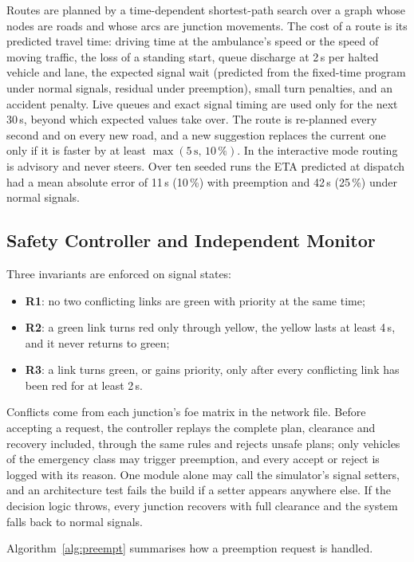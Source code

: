 \documentclass[conference]{IEEEtran}
\begin{document}
Routes are planned by a time-dependent shortest-path search over a graph whose nodes are roads and whose arcs are junction movements. The cost of a route is its predicted travel time: driving time at the ambulance's speed or the speed of moving traffic, the loss of a standing start, queue discharge at 2\,s per halted vehicle and lane, the expected signal wait (predicted from the fixed-time program under normal signals, residual under preemption), small turn penalties, and an accident penalty. Live queues and exact signal timing are used only for the next 30\,s, beyond which expected values take over. The route is re-planned every second and on every new road, and a new suggestion replaces the current one only if it is faster by at least $\max(5\,\mathrm{s},\,10\,\%)$. In the interactive mode routing is advisory and never steers. Over ten seeded runs the ETA predicted at dispatch had a mean absolute error of 11\,s (10\,\%) with preemption and 42\,s (25\,\%) under normal signals.

\subsection{Safety Controller and Independent Monitor}

Three invariants are enforced on signal states:
\begin{itemize}
\item \textbf{R1}: no two conflicting links are green with priority at the same time;
\item \textbf{R2}: a green link turns red only through yellow, the yellow lasts at least 4\,s, and it never returns to green;
\item \textbf{R3}: a link turns green, or gains priority, only after every conflicting link has been red for at least 2\,s.
\end{itemize}
Conflicts come from each junction's foe matrix in the network file. Before accepting a request, the controller replays the complete plan, clearance and recovery included, through the same rules and rejects unsafe plans; only vehicles of the emergency class may trigger preemption, and every accept or reject is logged with its reason. One module alone may call the simulator's signal setters, and an architecture test fails the build if a setter appears anywhere else. If the decision logic throws, every junction recovers with full clearance and the system falls back to normal signals.

Algorithm~\ref{alg:preempt} summarises how a preemption request is handled.
\end{document}
